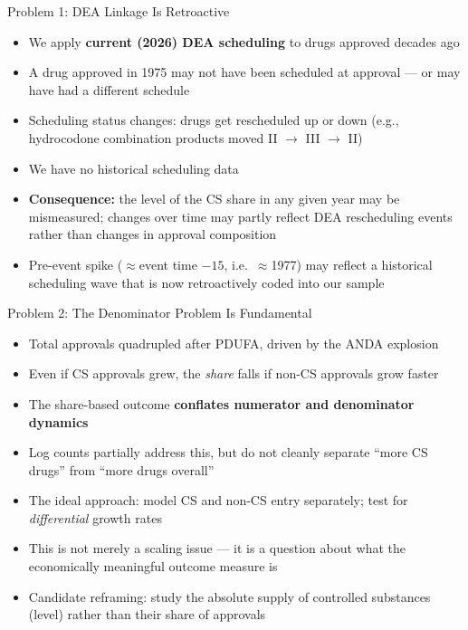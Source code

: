 \documentclass[10pt]{beamer}
\begin{document}
\begin{frame}[t]{Problem 1: DEA Linkage Is Retroactive}
  \begin{itemize}
    \item We apply \textbf{current (2026) DEA scheduling} to drugs approved
          decades ago
    \item A drug approved in 1975 may not have been scheduled at approval ---
          or may have had a different schedule
    \item Scheduling status changes: drugs get rescheduled up or down (e.g.,
          hydrocodone combination products moved II $\to$ III $\to$ II)
    \item We have \alert{no historical scheduling data}
    \item \textbf{Consequence:} the level of the CS share in any given year may
          be mismeasured; changes over time may partly reflect DEA
          rescheduling events rather than changes in approval composition
    \item Pre-event spike ($\approx$event time $-15$, i.e.\ $\approx$1977)
          may reflect a historical scheduling wave that is now retroactively
          coded into our sample
  \end{itemize}
\end{frame}

\begin{frame}[t]{Problem 2: The Denominator Problem Is Fundamental}
  \begin{itemize}
    \item Total approvals quadrupled after PDUFA, driven by the ANDA explosion
    \item Even if CS approvals grew, the \textit{share} falls if non-CS
          approvals grow faster
    \item The share-based outcome \textbf{conflates numerator and denominator
          dynamics}
    \item Log counts partially address this, but do not cleanly separate
          ``more CS drugs'' from ``more drugs overall''
    \item The ideal approach: model CS and non-CS entry separately; test for
          \textit{differential} growth rates
    \item This is not merely a scaling issue --- it is a question about what
          the economically meaningful outcome measure is
    \item \alert{Candidate reframing:} study the absolute supply of controlled
          substances (level) rather than their share of approvals
  \end{itemize}
\end{frame}
\end{document}
